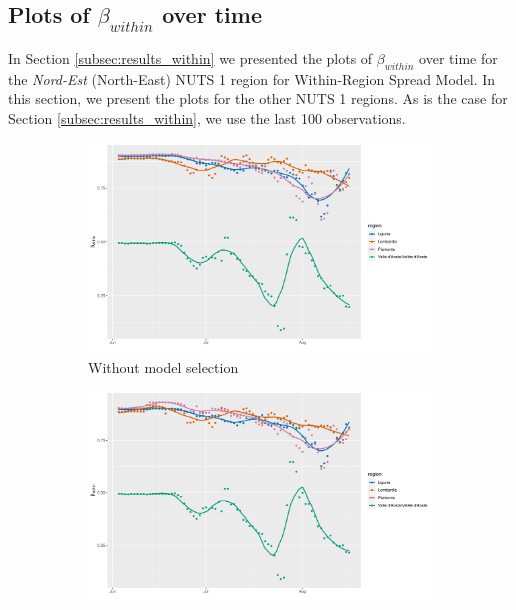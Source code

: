 \documentclass[12pt]{article}
\begin{document}
\begin{appendices}
		\subsection{Plots of $\beta_{within}$ over time} \label{sapp:model1_plots}
		In Section \ref{subsec:results_within} we presented the plots of $\beta_{within}$ over time for the \textit{Nord-Est} (North-East) NUTS 1 region for Within-Region Spread Model. In this section, we present the plots for the other NUTS 1 regions. As is the case for Section \ref{subsec:results_within}, we use the last 100 observations. \\
		
		\begin{figure}[H]
    	    \centering
    	    \begin{subfigure}{\textwidth}
    	      \centering
    	      \includegraphics[width=0.95\linewidth]{output/model1_lag3_betawithin_Nord-Ovest_rolling.pdf}
    	      \caption{Without model selection}
    	      \label{fig:beta_within_over_time_northwest_regular}
    	    \end{subfigure}\newline
    	    \begin{subfigure}{\textwidth}
    	      \centering
    	      \includegraphics[width=0.95\linewidth]{output/model1_lag3_betawithin_Nord-Ovest_aic_rolling.pdf}

\end{subfigure}
\end{figure}
\end{appendices}
\end{document}
